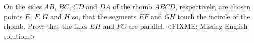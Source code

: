 \problem{}
On the sides $AB$, $BC$, $CD$ and $DA$ of the rhomb $ABCD$, respectively, are chosen points $E$, $F$, $G$ and $H$ so, that the segments $EF$ and $GH$ touch the incircle of the rhomb.
Prove that the lines $EH$ and $FG$ are parallel.
\solution
<FIXME: Missing English solution.>
\endproblem
